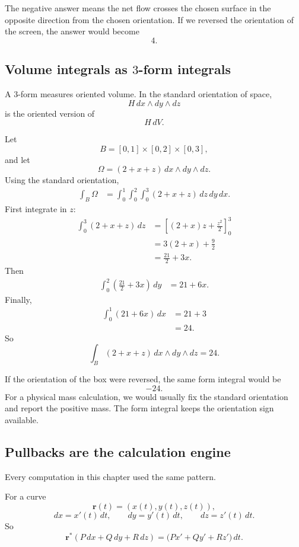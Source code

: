 The negative answer means the net flow crosses the chosen surface in the opposite
direction from the chosen orientation.  If we reversed the orientation of the screen, the
answer would become
\[
    4.
\]

\subsection{Volume integrals as \texorpdfstring{\(3\)}{3}-form integrals}

A \(3\)-form measures oriented volume.  In the standard orientation of space,
\[
    H\,dx\wedge dy\wedge dz
\]
is the oriented version of
\[
    H\,dV.
\]

Let
\[
    B=[0,1]\times[0,2]\times[0,3],
\]
and let
\[
    \Omega=(2+x+z)\,dx\wedge dy\wedge dz.
\]
Using the standard orientation,
\[
\begin{aligned}
    \int_B\Omega
    &=
    \int_0^1\int_0^2\int_0^3
    (2+x+z)\,dz\,dy\,dx.
\end{aligned}
\]
First integrate in \(z\):
\[
\begin{aligned}
    \int_0^3 (2+x+z)\,dz
    &=
    \left[(2+x)z+\frac{z^2}{2}\right]_0^3\\
    &=
    3(2+x)+\frac92\\
    &=
    \frac{21}{2}+3x.
\end{aligned}
\]
Then
\[
\begin{aligned}
    \int_0^2\left(\frac{21}{2}+3x\right)\,dy
    &=
    21+6x.
\end{aligned}
\]
Finally,
\[
\begin{aligned}
    \int_0^1(21+6x)\,dx
    &=
    21+3\\
    &=
    24.
\end{aligned}
\]
So
\[
\boxed{
    \int_B (2+x+z)\,dx\wedge dy\wedge dz=24.
}
\]

If the orientation of the box were reversed, the same form integral would be
\[
    -24.
\]
For a physical mass calculation, we would usually fix the standard orientation and
report the positive mass.  The form integral keeps the orientation sign available.

\subsection{Pullbacks are the calculation engine}

Every computation in this chapter used the same pattern.

For a curve
\[
    \mathbf r(t)=(x(t),y(t),z(t)),
\]
\[
\boxed{
    dx=x'(t)\,dt,\qquad
    dy=y'(t)\,dt,\qquad
    dz=z'(t)\,dt.
}
\]
So
\[
\boxed{
    \mathbf r^*(P\,dx+Q\,dy+R\,dz)
    =
    \bigl(Px'+Qy'+Rz'\bigr)\,dt.
}
\]

